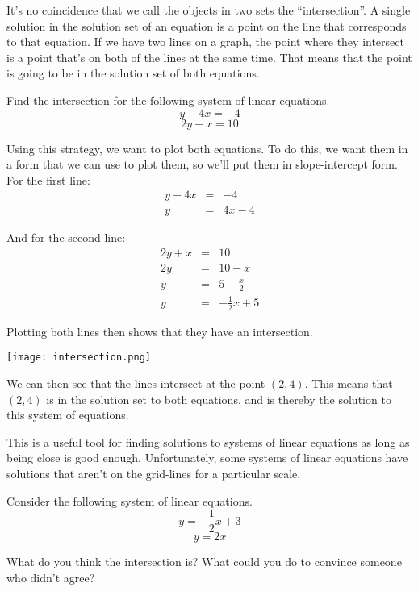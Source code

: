 It's no coincidence that we call the objects in two sets the ``intersection''.  A single solution in the solution set of an equation is a point on the line that corresponds to that equation.  If we have two lines on a graph, the point where they intersect is a point that's on both of the lines at the same time.  That means that the point is going to be in the solution set of both equations.

\begin{example}
Find the intersection for the following system of linear equations.
$$y - 4x = -4$$
$$2y + x = 10$$

Using this strategy, we want to plot both equations.  To do this, we want them in a form that we can use to plot them, so we'll put them in slope-intercept form.
For the first line:
$$
\begin{array}{rcl}
y - 4x & = & -4 \\
y & = & 4x - 4 \end{array}$$

And for the second line:
$$\begin{array}{rcl}
2y + x & = & 10 \\
2y & = & 10 - x \\ 
y & = & 5 - \frac{x}{2} \\
y & = & - \frac{1}{2} x + 5 \end{array}$$

Plotting both lines then shows that they have an intersection.
\begin{center}
\texttt{[image: intersection.png]}	
\end{center}

We can then see that the lines intersect at the point $(2,4)$.  This means that $(2,4)$ is in the solution set to both equations, and is thereby the solution to this system of equations.
\end{example}

This is a useful tool for finding solutions to systems of linear equations as long as being close is good enough.  Unfortunately, some systems of linear equations have solutions that aren't on the grid-lines for a particular scale.

\begin{prblm}
Consider the following system of linear equations.
$$y = -\frac{1}{2}x + 3$$
$$y = 2x$$

What do you think the intersection is?  What could you do to convince someone who didn't agree?

\vspace{4cm}
\end{prblm}


